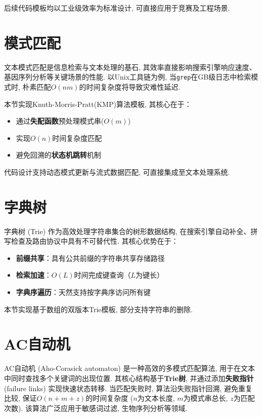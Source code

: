 \documentclass[a4paper]{ctexbook}
\begin{document}
后续代码模板均以工业级效率为标准设计, 可直接应用于竞赛及工程场景.

\section{模式匹配}

文本模式匹配是信息检索与文本处理的基石, 其效率直接影响搜索引擎响应速度、基因序列分析等关键场景的性能. 以Unix工具链为例, 当\texttt{grep}在GB级日志中检索模式时, 朴素匹配$O(nm)$的时间复杂度将导致灾难性延迟.

本节实现Knuth-Morris-Pratt(KMP)算法模板, 其核心在于：
\begin{itemize}
	\item 通过\textbf{失配函数}预处理模式串($O(m)$)
	\item 实现$O(n)$时间复杂度匹配
	\item 避免回溯的\textbf{状态机跳转}机制
\end{itemize}
代码设计支持动态模式更新与流式数据匹配, 可直接集成至文本处理系统.



\section{字典树}

字典树 (Trie) 作为高效处理字符串集合的树形数据结构, 在搜索引擎自动补全、拼写检查及路由协议中具有不可替代性. 其核心优势在于：
\begin{itemize}
	\item \textbf{前缀共享}：具有公共前缀的字符串共享存储路径
	\item \textbf{检索加速}：$O(L)$时间完成键查询（$L$为键长）
	\item \textbf{字典序遍历}：天然支持按字典序访问所有键
\end{itemize}

本节实现基于数组的双版本Trie模板, 部分支持字符串的删除.



\section{AC自动机}

AC自动机 (Aho-Corasick automaton) 是一种高效的多模式匹配算法, 用于在文本中同时查找多个关键词的出现位置. 其核心结构基于\textbf{Trie树}, 并通过添加\textbf{失败指针} (failure links) 实现快速状态转移.
当匹配失败时, 算法沿失败指针回溯, 避免重复比较, 保证$O(n+m+z)$的时间复杂度 ($n$为文本长度, $m$为模式串总长, $z$为匹配次数). 该算法广泛应用于敏感词过滤, 生物序列分析等领域.
\end{document}
